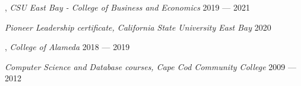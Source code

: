 
, \textit{CSU East Bay - College of Business and Economics}	\hfill 2019 --- 2021

\textit{Pioneer Leadership certificate, California State University East Bay} \hfill 2020

, \textit{College of Alameda} \hfill	2018 --- 2019

\textit{Computer Science and Database courses, Cape Cod Community College} \hfill	2009 --- 2012
